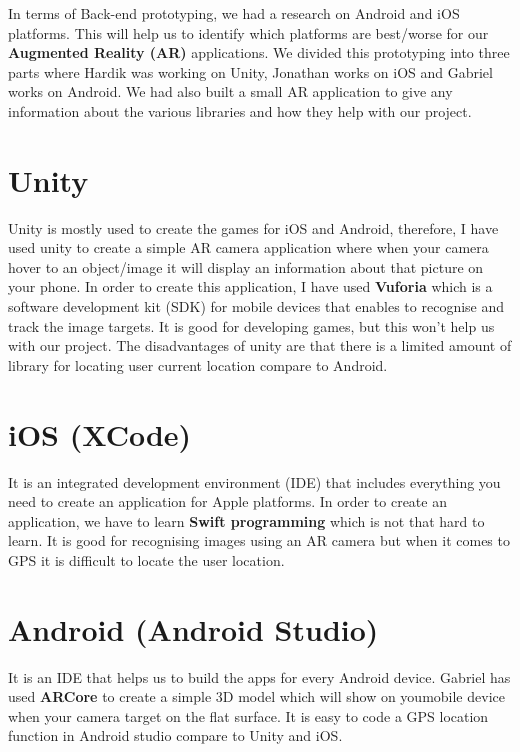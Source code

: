 
In terms of Back-end prototyping, we had a research on Android and iOS platforms. This will help us to identify which platforms are best/worse for our \textbf {Augmented Reality (AR)} applications. We divided this prototyping into three parts where Hardik was working on Unity, Jonathan works on iOS and Gabriel works on Android. We had also built a small AR application to give any information about the various libraries and how they help with our project.

\section{Unity}
Unity is mostly used to create the games for iOS and Android, therefore, I have used unity to create a simple AR camera application where when your camera hover to an object/image it will display an information about that picture on your phone. In order to create this application, I have used \textbf {Vuforia} which is a software development kit (SDK) for mobile devices that enables to recognise and track the image targets. It is good for developing games, but this won’t help us with our project. The disadvantages of unity are that there is a limited amount of library for locating user current location compare to Android.

\section{iOS (XCode)}
It is an integrated development environment (IDE) that includes everything you need to create an application for Apple platforms. In order to create an application, we have to learn \textbf {Swift programming} which is not that hard to learn. It is good for recognising images using an AR camera but when it comes to GPS it is difficult to locate the user location.

\section{Android (Android Studio)}
It is an IDE that helps us to build the apps for every Android device. Gabriel has used \textbf {ARCore} to create a simple 3D model which will show on youmobile device when your camera target on the flat surface. It is easy to code a GPS location function in Android studio compare to Unity and iOS.
